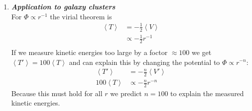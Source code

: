 \documentclass[a4paper,12pt]{article}
\newcommand{\question}[1]{\textbf{\textit{#1}}}
\begin{document}
\begin{enumerate}
			\setcounter{equation}{0}
			\item \question{Application to galaxy clusters}\\
			For $\Phi\propto r^{-1}$ the virial theorem is 
			\begin{align}
			\left< T\right> &= -\frac{1}{2}\left< V\right>\\
			&\propto -\frac{1}{2}r^{-1}\\
			\end{align}
			If we measure kinetic energies too large by a foctor $\approx 100$ we get $\left < T'\right >=100\left < T\right >$ and can explain this by changing the potential to $\Phi\propto r^{-n}$:
			\begin{align}
			\left < T'\right > &= -\frac{n}{2}\left < V'\right >\\
			100\left < T \right > &\propto -\frac{n}{2} r^{-n}
			\end{align} 
			Because this must hold for all $r$ we predict $n=100$ to explain the measured kinetic energies.
			
		\end{enumerate}
	
\end{document}
